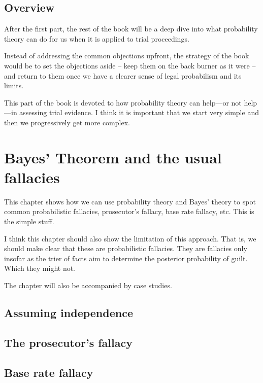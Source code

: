 \documentclass[]{book}
\begin{document}
\section*{Overview}

After the first part, the rest of the book will
be a deep dive into what probability theory can do for us
when it is applied to trial proceedings.

Instead of addressing the common objections
upfront, the strategy of the book would
be to set the objections
aside -- keep them on the back burner
as it were -- and return to them once we have
a clearer sense of legal probabilism
and its limits.


This part of the book is devoted to how probability
theory can help---or not help---in assessing
trial evidence. I think it is important that
we start very simple and then we progressively
get more complex.

\chapter{Bayes' Theorem and the usual fallacies}

This chapter shows how we can use probability theory
and Bayes' theory to spot common probabilistic fallacies,
prosecutor's fallacy, base rate fallacy, etc.
This is the simple stuff.

I think this chapter should also show the limitation
of this approach. That is, we should make clear that these
are probabilistic fallacies. They are fallacies only insofar as the trier of facts
aim to determine the posterior probability of guilt. Which they might not.

The chapter will also be accompanied
by case studies.

\section{Assuming independence}

\section{The prosecutor's fallacy}

\section{Base rate fallacy}
\end{document}
